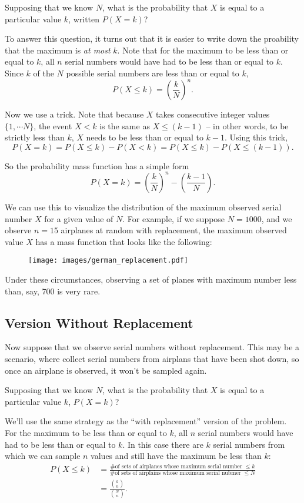 \documentclass[11pt]{article}
\begin{document}
Supposing that we know $N$, what is the probability that $X$ is equal to a particular value $k$, written $P(X = k)$?

To answer this question, it turns out that it is easier to write down the proability that the maximum is \emph{at most} $k$.
Note that for the maximum to be less than or equal to $k$, all $n$ serial numbers would have had to be less than or equal to $k$.
Since $k$ of the $N$ possible serial numbers are less than or equal to $k$,
$$
P(X \leq k) = \left(\frac{k}{N}\right)^n.
$$

Now we use a trick. Note that because $X$ takes consecutive integer values $\{1, \cdots N\}$, the event $X < k$ is the same as
$X \leq (k-1)$ -- in other words, to be strictly less than $k$, $X$ needs to be less than or equal to $k-1$. Using this trick,
$$
P(X = k) = P(X \leq k) - P(X < k) = P(X \leq k) - P(X \leq (k-1)).
$$

So the probability mass function has a simple form
$$
P(X = k) = \left(\frac{k}{N}\right)^n - \left(\frac{k-1}{N}\right).
$$

We can use this to visualize the distribution of the maximum observed serial number $X$ for a given value of $N$. For example,
if we suppose $N = 1000$, and we observe $n = 15$ airplanes at random with replacement, the maximum observed value $X$ has a
mass function that looks like the following:

\begin{figure}[h!]
    \centering
    \texttt{[image: images/german\_replacement.pdf]}
\end{figure}

Under these circumstances, observing a set of planes with maximum number less than, say, 700 is very rare.

\subsection*{Version Without Replacement}
Now suppose that we observe serial numbers without replacement. This may be a scenario,
where collect serial numbers from airplans that have been shot down, so once an airplane is observed,
it won't be sampled again.

Supposing that we know $N$, what is the probability that $X$ is equal to a particular value $k$, $P(X = k)$?

We'll use the same strategy as the ``with replacement'' version of the problem.
For the maximum to be less than or equal to $k$, all $n$ serial numbers would have had to be less than or equal to $k$.
In this case there are $k$ serial numbers from which we can sample $n$ values and still have the maximum be less than $k$:
\begin{align*}
    P(X \leq k) &= \frac{\textrm{\# of sets of airplanes whose maximum serial number $\leq k$}}{\textrm{\# of sets of airplains whose maximum serial nubmer $\leq N$}}\\
                &= \frac{{k \choose n}}{{N \choose n}}
.
\end{align*}
\end{document}
